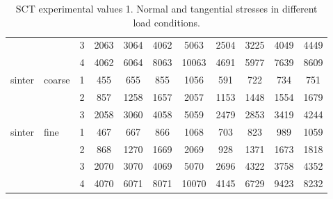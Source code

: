 \begin{table}
\begin{tabular}{ll|c|cccc|cccc}
          &       & 3     & 2063  & 3064  & 4062  & 5063  & 2504  & 3225  & 4049  & 4449 \\
          &       & 4     & 4062  & 6064  & 8063  & 10063 & 4691  & 5977  & 7639  & 8609 \\
\hline
    sinter & coarse & 1     & 455   & 655   & 855   & 1056  & 591   & 722   & 734   & 751 \\
          &       & 2     & 857   & 1258  & 1657  & 2057  & 1153  & 1448  & 1554  & 1679 \\
          &       & 3     & 2058  & 3060  & 4058  & 5059  & 2479  & 2853  & 3419  & 4244 \\
\hline
    sinter & fine  & 1     & 467   & 667   & 866   & 1068  & 703   & 823   & 989   & 1059 \\
          &       & 2     & 868   & 1270  & 1669  & 2069  & 928   & 1371  & 1673  & 1818 \\
          &       & 3     & 2070  & 3070  & 4069  & 5070  & 2696  & 4322  & 3758  & 4352 \\
          &       & 4     & 4070  & 6071  & 8071  & 10070 & 4145  & 6729  & 9423  & 8232 \\
       \hline
\end{tabular}
\caption[SCT experimental values 1]{\acs{SCT} experimental values 1. Normal and
tangential stresses in different load conditions.}
\label{tab:21shearcell2}
\end{table}